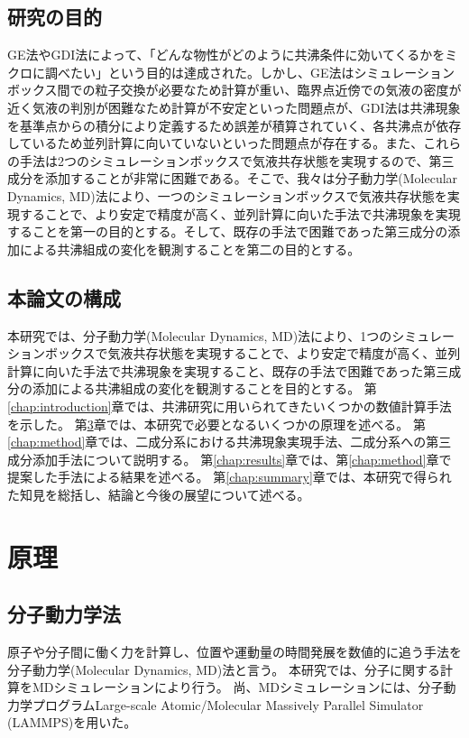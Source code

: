 \documentclass[titlepage]{jsreport}
\begin{document}
\section{研究の目的} \label{introduction:purpose}
GE法やGDI法によって、「どんな物性がどのように共沸条件に効いてくるかをミクロに調べたい」という目的は達成された。しかし、GE法はシミュレーションボックス間での粒子交換が必要なため計算が重い、臨界点近傍での気液の密度が近く気液の判別が困難なため計算が不安定といった問題点が、GDI法は共沸現象を基準点からの積分により定義するため誤差が積算されていく、各共沸点が依存しているため並列計算に向いていないといった問題点が存在する。また、これらの手法は2つのシミュレーションボックスで気液共存状態を実現するので、第三成分を添加することが非常に困難である。そこで、我々は分子動力学(Molecular Dynamics, MD)法により、一つのシミュレーションボックスで気液共存状態を実現することで、より安定で精度が高く、並列計算に向いた手法で共沸現象を実現することを第一の目的とする。そして、既存の手法で困難であった第三成分の添加による共沸組成の変化を観測することを第二の目的とする。


\section{本論文の構成} \label{introduction:constitution}
本研究では、分子動力学(Molecular Dynamics, MD)法により、1つのシミュレーションボックスで気液共存状態を実現することで、より安定で精度が高く、並列計算に向いた手法で共沸現象を実現すること、既存の手法で困難であった第三成分の添加による共沸組成の変化を観測することを目的とする。
第\ref{chap:introduction}章では、共沸研究に用いられてきたいくつかの数値計算手法を示した。
第\ref{chap:principle}章では、本研究で必要となるいくつかの原理を述べる。
第\ref{chap:method}章では、二成分系における共沸現象実現手法、二成分系への第三成分添加手法について説明する。
第\ref{chap:results}章では、第\ref{chap:method}章で提案した手法による結果を述べる。
第\ref{chap:summary}章では、本研究で得られた知見を総括し、結論と今後の展望について述べる。


\chapter{原理} \label{chap:principle}
\section{分子動力学法}\label{principle-sec:molecular-dynamics}
原子や分子間に働く力を計算し、位置や運動量の時間発展を数値的に追う手法を分子動力学(Molecular Dynamics, MD)法と言う。
本研究では、分子に関する計算をMDシミュレーションにより行う。
尚、MDシミュレーションには、分子動力学プログラムLarge-scale Atomic/Molecular Massively Parallel Simulator\,(LAMMPS)\cite{lammps}を用いた。
\end{document}
